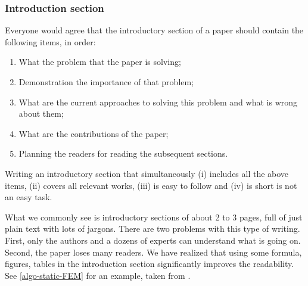 \documentclass[authoryear,3p,times,preprint,review,fleqn]{elsarticle}
\numberwithin{equation}{section}
\theoremstyle{remark}
\begin{document}
\subsubsection{Introduction section}\label{sec:introduction-part}

Everyone would agree that the introductory section of a paper should contain the following items, in order:

\begin{enumerate}
\item What the problem that the paper is solving;
\item Demonstration the importance of that problem;
\item What are the current approaches to solving this problem and what is wrong about them;
\item What are the contributions of the paper; 
\item Planning  the readers for reading the subsequent sections.
\end{enumerate}

Writing an introductory section that simultaneously (i) includes all the above items, (ii) covers all relevant works, (iii) is easy to follow and (iv) is short is not an easy task.

What we commonly see is introductory sections of about 2 to 3 pages, full of just plain text with lots of jargons. There are two problems with this type of writing. First, only the authors and a dozens of experts can understand what is going on. Second, the paper loses many readers. We have realized that using some formula, figures, tables in the introduction section significantly improves the readability.
See \cref{algo-static-FEM} for an example, taken from \cite{Mandal:EFM2019}.
\end{document}
